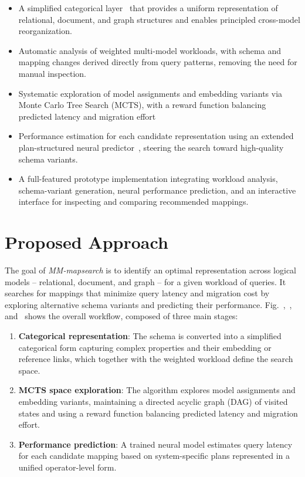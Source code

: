 \begin{itemize}
    \item A simplified categorical layer~\citep{mm_cat_journal} that provides a uniform representation of relational, document, and graph structures and enables principled cross-model reorganization.
    \item Automatic analysis of weighted multi-model workloads, with schema and mapping changes derived directly from query patterns, removing the need for manual inspection.
    \item Systematic exploration of model assignments and embedding variants via Monte Carlo Tree Search (MCTS), with a reward function balancing predicted latency and migration effort
    \item Performance estimation for each candidate representation using an extended plan-structured neural predictor~\citep{10.14778/3342263.3342646}, steering the search toward high-quality schema variants.
    \item A full-featured prototype implementation integrating workload analysis, schema-variant generation, neural performance prediction, and an interactive interface for inspecting and comparing recommended mappings.
\end{itemize}

\section{Proposed Approach}

The goal of \textit{MM-mapsearch} is to identify an optimal representation across logical models -- relational, document, and graph -- for a given workload of queries. It searches for mappings that minimize query latency and migration cost by exploring alternative schema variants and predicting their performance. Fig.~,~, and~ shows the overall workflow, composed of three main stages:

\begin{enumerate}
    \item \textbf{Categorical representation}: The schema is converted into a simplified categorical form capturing complex properties and their embedding or reference links, which together with the weighted workload define the search space.
    \item \textbf{MCTS space exploration}: The algorithm explores model assignments and embedding variants, maintaining a directed acyclic graph (DAG) of visited states and using a reward function balancing predicted latency and migration effort.
    \item \textbf{Performance prediction}: A trained neural model estimates query latency for each candidate mapping based on system-specific plans represented in a unified operator-level form.
\end{enumerate}

